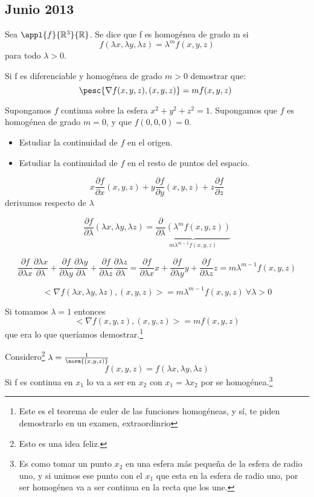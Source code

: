 \subsection{Junio 2013}
\begin{problem}[1]
 Sea $\appl{f}{\mathbb{R}^3}{\mathbb{R}}$. Se dice que f es homogénea de grado m si\\
$$f(\lambda x, \lambda y, \lambda z) = \lambda ^m f(x,y,z)$$ para todo $\lambda > 0$.

\ppart  Si f es diferenciable y homogénea de grado $m>0$ demostrar que:
\[ \pesc{\nabla f(x,y,z), (x,y,z)} = mf(x,y,z) \]

\ppart Supongamos $f$ continua sobre la esfera ${x^2+y^2+z^2=1}$. Supongamos que $f$ es homogénea de grado $m = 0$, y que $f(0,0,0) = 0$.

\begin{itemize}
\item Estudiar la continuidad de $f$ en el origen.
\item Estudiar la continuidad de $f$ en el resto de puntos del espacio.
\end{itemize}

\solution

\spart \[ x\frac{\partial  f}{\partial  x}(x,y,z) + y\frac{\partial  f}{\partial  y}(x,y,z) + z\frac{\partial  f}{\partial  z}\]
derivamos respecto de $\lambda$

$$\frac{\partial  f}{\partial  \lambda}(\lambda x, \lambda y, \lambda z) = \underbrace{\frac{\partial }{\partial  \lambda}(\lambda^mf(x,y,z))}_{m\lambda^{m-1}f(x,y,z)}$$

$$\frac{\partial  f}{\partial  \lambda x}\frac{\partial  \lambda x}{\partial  \lambda} + \frac{\partial  f}{\partial  \lambda y}\frac{\partial  \lambda y}{\partial  \lambda} + \frac{\partial  f}{\partial  \lambda z}\frac{\partial  \lambda z}{\partial  \lambda} = \frac{\partial  f}{\partial  \lambda x}x + \frac{\partial  f}{\partial  \lambda y}y + \frac{\partial  f}{\partial  \lambda z}z = m\lambda ^{m-1} f(x,y,z) $$

$$<\nabla f(\lambda x,\lambda y,\lambda z), (x,y,z) > = m\lambda^{m-1} f(x,y,z)\ \forall \lambda > 0$$

Si tomamos $\lambda = 1$ entonces $$<\nabla f(x,y,z), (x,y,z) > = mf(x,y,z)$$ que era lo que queríamos demostrar.\footnote{Este es el teorema de euler de las funciones homogéneas, y sí, te piden demostrarlo en un examen, extraordinrio}


\spart 
Considero\footnote{Esto es una idea feliz.} $\lambda = \frac{1}{\norm{(x,y,z)}}$\\
\[ f(x,y,z) = f(\lambda x, \lambda y, \lambda z) \]
Si f es continua en $x_1$ lo va a ser en $x_2$ con $x_1 = \lambda x_2$ por se homogénea.\footnote{Es como tomar un punto $x_2$ en una esfera más pequeña de la esfera de radio uno, y si unimos ese punto con el $x_1$ que esta en la esfera de radio uno, por ser homogénea va a ser continua en la recta que los une.}


\end{problem}
